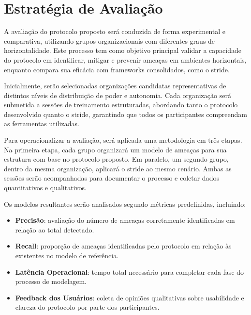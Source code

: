 \section{Estratégia de Avaliação}
\label{sec:evaluation_strategy}

A avaliação do protocolo proposto será conduzida de forma experimental e
comparativa, utilizando grupos organizacionais com diferentes graus de
horizontalidade. Este processo tem como objetivo principal validar a capacidade
do protocolo em identificar, mitigar e prevenir ameaças em ambientes
horizontais, enquanto compara sua eficácia com frameworks consolidados, como o
\gls{stride}.

Inicialmente, serão selecionadas organizações candidatas representativas de
distintos níveis de distribuição de poder e autonomia. Cada organização será
submetida a sessões de treinamento estruturadas, abordando tanto o protocolo
desenvolvido quanto o \gls{stride}, garantindo que todos os participantes compreendam
as ferramentas utilizadas.

Para operacionalizar a avaliação, será aplicada uma metodologia em três etapas.
Na primeira etapa, cada grupo organizará um modelo de ameaças para sua estrutura
com base no protocolo proposto. Em paralelo, um segundo grupo, dentro da mesma
organização, aplicará o \gls{stride} ao mesmo cenário. Ambas as sessões
serão acompanhadas para documentar o processo e coletar dados
quantitativos e qualitativos.

Os modelos resultantes serão analisados segundo métricas predefinidas, incluindo:

\begin{itemize}

    \item \textbf{Precisão}: avaliação do número de ameaças corretamente identificadas
    em relação ao total detectado.

    \item \textbf{Recall}: proporção de ameaças identificadas pelo protocolo em relação
    às existentes no modelo de referência.

    \item \textbf{Latência Operacional}: tempo total necessário para completar cada fase
    do processo de modelagem.

    \item \textbf{Feedback dos Usuários}: coleta de opiniões qualitativas sobre
    usabilidade e clareza do protocolo por parte dos participantes.

\end{itemize}


